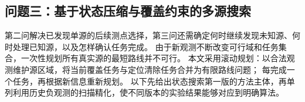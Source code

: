 \subsection{问题三：基于状态压缩与覆盖约束的多源搜索}\label{sec:q3}

第二问解决已发现单源的后续测点选择，第三问还需确定何时继续发现未知源、何时处理已知源，以及怎样确认任务完成。
由于新观测不断改变可行域和任务集合，一次性规划所有真实源的最短路线并不可行。
本文采用滚动规划：以合法观测维护源区域，将当前覆盖任务与定位清除任务合并为有限路线问题；
每完成一个任务，再根据新信息重新规划。
以下先给出状态搜索第一版的方法主体，再单列利用历史负观测的扫描精化，使不同版本的实验结果能够对应到明确算法。

%
%
%
%
%
